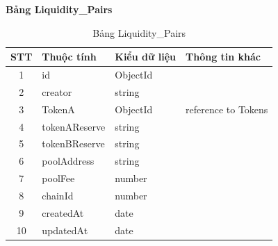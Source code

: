 \clearpage
\hspace{-1cm}\textbf{Bảng Liquidity\_Pairs}
\begin{table}[H]
    \centering
    \begin{tabular}{|c|l|l|l|}
        \hline
        STT & Thuộc tính    & Kiểu dữ liệu & Thông tin khác      \\
        \hline
        1   & id            & ObjectId     &                     \\
        \hline
        2   & creator       & string       &                     \\
        \hline
        3   & TokenA        & ObjectId     & reference to Tokens \\
        \hline
        4   & tokenAReserve & string       &                     \\
        \hline
        5   & tokenBReserve & string       &                     \\
        \hline
        6   & poolAddress   & string       &                     \\
        \hline
        7   & poolFee       & number       &                     \\
        \hline
        8   & chainId       & number       &                     \\
        \hline
        9   & createdAt     & date         &                     \\
        \hline
        10  & updatedAt     & date         &                     \\
        \hline
    \end{tabular}
    \caption{Bảng Liquidity\_Pairs}
    \label{tab:liquidity-pairs}
\end{table}

